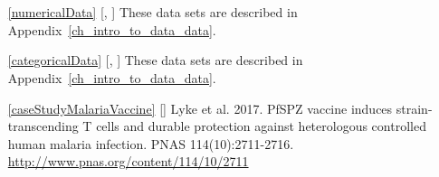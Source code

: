 \section{}
\label{ch_summarizing_data_data}

\begin{itemize}
\item[\ref{numericalData}]
    [\datalink{loan50}, \datalink{county}]
    These data sets are described in
    Appendix~\ref{ch_intro_to_data_data}.

\item[\ref{categoricalData}]
    [\datalink{loan50}, \datalink{county}]
    These data sets are described in
    Appendix~\ref{ch_intro_to_data_data}.

\item[\ref{caseStudyMalariaVaccine}]
    [\datalink{malaria}]
    Lyke et al. 2017.
    PfSPZ vaccine induces strain-transcending T cells
    and durable protection against heterologous controlled
    human malaria infection.
    PNAS 114(10):2711-2716.
    \url{http://www.pnas.org/content/114/10/2711}
\end{itemize}









\section{}
\label{ch_probability_data}

